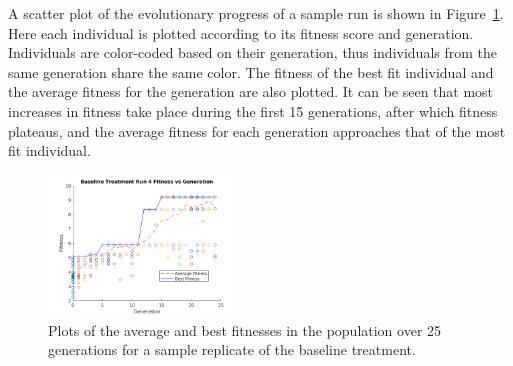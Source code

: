 A scatter plot of the evolutionary progress of a sample run is shown in Figure~\ref{evol_track_fig}. Here each individual is plotted according to its fitness score and generation. Individuals are color-coded based on their generation, thus individuals from the same generation share the same color. The fitness of the best fit individual and the average fitness for the generation are also plotted. It can be seen that most increases in fitness take place during the first 15 generations, after which fitness plateaus, and the average fitness for each generation approaches that of the most fit individual.

\begin{figure}[ht]
	\centering
    \includegraphics[width=0.45\textwidth]{Figures/fitness_vs_generation_editted.png}
    \caption{Plots of the average and best fitnesses in the population over 25 generations for a sample replicate of the baseline treatment.}
    \label{evol_track_fig}
    \vspace{-0.1in}
\end{figure}



